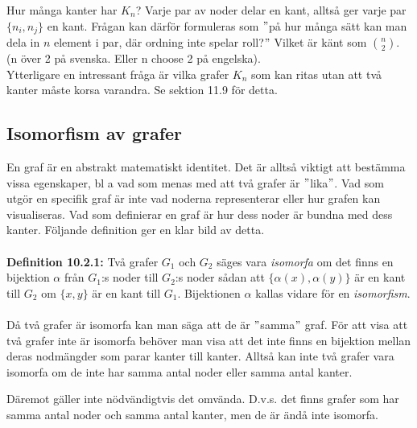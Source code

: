 \documentclass{article}
\begin{document}
Hur många kanter har $K_n$? Varje par av noder delar en kant, alltså ger varje par $\{n_i,n_j\}$ en kant. Frågan kan därför formuleras som $"$på hur många sätt kan man dela in $n$ element i par, där ordning inte spelar roll?$"$ Vilket är känt som ${n \choose 2}$.\\ (n över 2 på svenska. Eller n choose 2 på engelska).
\\

Ytterligare en intressant fråga är vilka grafer $K_n$ som kan ritas utan att två kanter måste korsa varandra. Se sektion 11.9 för detta.

\subsection{Isomorfism av grafer}
En graf är en abstrakt matematiskt identitet. Det är alltså viktigt att bestämma vissa egenskaper, bl a vad som menas med att två grafer är $"$lika$"$. Vad som utgör en specifik graf är inte vad noderna representerar eller hur grafen kan visualiseras. Vad som definierar en graf är hur dess noder är bundna med dess kanter. Följande definition ger en klar bild av detta. \\ \\
\textbf{Definition 10.2.1:} Två grafer $G_1$ och $G_2$ säges vara \textit{isomorfa} om det finns en bijektion $\alpha$ från $G_1$:s noder till $G_2$:s noder sådan att $\{\alpha(x),\alpha(y)\}$ är en kant till $G_2$ om $\{x,y\}$ är en kant till $G_1$. Bijektionen $\alpha$ kallas vidare för en \textit{isomorfism}.
\\ \\
Då två grafer är isomorfa kan man säga att de är $"$samma$"$ graf. För att visa att två grafer inte är isomorfa behöver man visa att det inte finns en bijektion mellan deras nodmängder som parar kanter till kanter. Alltså kan inte två grafer vara isomorfa om de inte har samma antal noder eller samma antal kanter. 

Däremot gäller inte nödvändigtvis det omvända. D.v.s. det finns grafer som har samma antal noder och samma antal kanter, men de är ändå inte isomorfa.
\\
\end{document}
